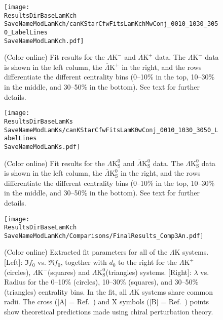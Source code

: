 \documentclass[ALICE,manyauthors]{cernphprep}
\newcommand{\ResultsDirBaseLamKch}{/home/jesse/Analysis/FemtoAnalysis/Results/Results_cLamcKch_20180505/}
\newcommand{\ResultsDirBaseLamKs}{/home/jesse/Analysis/FemtoAnalysis/Results/Results_cLamK0_20180505/}
\newcommand{\MomRes}{_MomResCrctn}%
\newcommand{\NonFlatBgdLamKch}{_NonFlatBgdCrctnLamK0LamKchPolynomial}
\newcommand{\NonFlatBgdLamKs}{_NonFlatBgdCrctnLamK0LamKchPolynomial}
\newcommand{\ResNum}{_3Res}
\newcommand{\PrimMaxDecay}{_PrimMaxDecay10fm}
\newcommand{\ResMethod}{_UsingXiDataAndCoulombOnly}
\newcommand{\ParamFixAndShareLamKch}{_ShareLam_Dualie_ShareLam_ShareRadii}
\newcommand{\ParamFixAndShareLamKs}{_ShareLam_Dualie_ShareLam_ShareRadii}
\newcommand{\SaveNameModLamKch}{\MomRes\NonFlatBgdLamKch\ResNum\PrimMaxDecay\ResMethod\ParamFixAndShareLamKch}
\newcommand{\SaveNameModLamKs}{\MomRes\NonFlatBgdLamKs\ResNum\PrimMaxDecay\ResMethod\ParamFixAndShareLamKs}
\newcommand{\LamK}{$\Lambda$K\xspace}
\newcommand{\LamKchP}{$\Lambda\mathrm{K^{+}}$\xspace}
\newcommand{\LamKchM}{$\Lambda\mathrm{K^{-}}$\xspace}
\newcommand{\ALamKchP}{$\overline{\Lambda}\mathrm{K^{+}}$\xspace}
\newcommand{\LamKchMALamKchP}{$\Lambda\mathrm{K^{-}}$ ($\overline{\Lambda}\mathrm{K^{+}}$)\xspace}
\newcommand{\LamKs}{$\Lambda\mathrm{K^{0}_{S}}$\xspace}
\newcommand{\ALamKs}{$\overline{\Lambda}\mathrm{K^{0}_{S}}$\xspace}
\newcommand{\LamALamKs}{$\Lambda$($\overline{\Lambda}$)$\mathrm{K^{0}_{S}}$\xspace}
\begin{document}
\begin{figure}[h!]
  \centering
  \texttt{[image: \\ResultsDirBaseLamKch\\SaveNameModLamKch/canKStarCfwFitsLamKchMwConj\_0010\_1030\_3050\_LabelLines\\SaveNameModLamKch.pdf]}
  \caption[\LamKchMALamKchP data with fits]
  {
  (Color online) Fit results for the \LamKchM and \ALamKchP data.
  The \LamKchM data is shown in the left column, the \ALamKchP in the right, and the rows differentiate the different centrality bins (0--10\% in the top, 10--30\% in the middle, and 30--50\% in the bottom).
 See text for further details.
 }
  \label{fig:LamKchMwConjFits_3Res}
\end{figure}


\begin{figure}[h!]
  \centering
  \texttt{[image: \\ResultsDirBaseLamKs\\SaveNameModLamKs/canKStarCfwFitsLamK0wConj\_0010\_1030\_3050\_LabelLines\\SaveNameModLamKs.pdf]}
  \caption[\LamALamKs data with fits]
  {
  (Color online) Fit results for the \LamKs and \ALamKs data.
  The \LamKs data is shown in the left column, the \ALamKs in the right, and the rows differentiate the different centrality bins (0--10\% in the top, 10--30\% in the middle, and 30--50\% in the bottom).
 See text for further details.
 }
  \label{fig:LamK0wConjFits_3Res}
\end{figure}




\begin{figure}[h]
  \centering
  \texttt{[image: \\ResultsDirBaseLamKch\\SaveNameModLamKch/Comparisons/FinalResults\_Comp3An.pdf]}
  \caption[Extracted Scattering Parameters]
  {
  (Color online) Extracted fit parameters for all of the \LamK systems.  
  [Left]: $\Im f_{0}$ vs. $\Re f_{0}$, together with $d_{0}$ to the right for the \LamKchP (circles), \LamKchM (squares) and \LamKs (triangles) systems.  
  [Right]: $\lambda$ vs. Radius for the 0--10\% (circles), 10--30\% (squares), and 30--50\% (triangles) centrality bins.  
  In the fit, all \LamK systems share common radii.
  The cross ([A] = Ref.\ \cite{Liu:2006xja}) and X symbols ([B] = Ref.\ \cite{Mai:2009ce}) points show theoretical predictions made using chiral perturbation theory.
  }
  \label{fig:ScattParams_3Res}
\end{figure}
\end{document}
